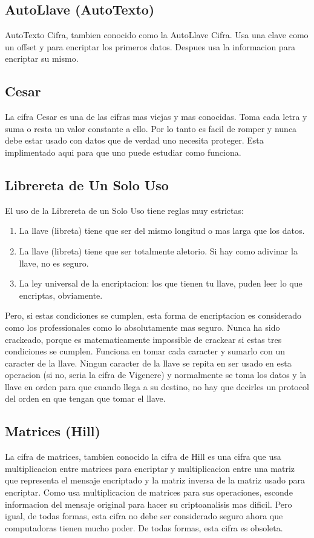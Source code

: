 \documentclass{article}
\begin{document}
		\subsection{AutoLlave (AutoTexto)}
			AutoTexto Cifra, tambien conocido como la AutoLlave Cifra. Usa una clave como un offset y para encriptar los primeros datos. Despues usa la informacion para encriptar su mismo.
		\subsection{Cesar}
			La cifra Cesar es una de las cifras mas viejas y mas conocidas. Toma cada letra y suma o resta un valor constante a ello. Por lo tanto es facil de romper y nunca debe estar usado con datos que de verdad uno necesita proteger. Esta implimentado aqui para que uno puede estudiar como funciona.
		\subsection{Librereta de Un Solo Uso}
			El uso de la Librereta de un Solo Uso tiene reglas muy estrictas:
			\begin{enumerate}  
				\item La llave (libreta) tiene que ser del mismo longitud o mas larga que los datos.
				\item La llave (libreta) tiene que ser totalmente aletorio. Si hay como adivinar la llave, no es seguro.
				\item La ley universal de la encriptacion: los que tienen tu llave, puden leer lo que encriptas, obviamente.
			\end{enumerate}  
			Pero, si estas condiciones se cumplen, esta forma de encriptacion es considerado como los professionales como lo absolutamente mas seguro. Nunca ha sido crackeado, porque es matematicamente impossible de crackear si estas tres condiciones se cumplen. Funciona en tomar cada caracter y sumarlo con un caracter de la llave. Ningun caracter de la llave se repita en ser usado en esta operacion (si no, seria la cifra de Vigenere) y normalmente se toma los datos y la llave en orden para que cuando llega a su destino, no hay que decirles un protocol del orden en que tengan que tomar el llave.
		\subsection{Matrices (Hill)}
			La cifra de matrices, tambien conocido la cifra de Hill es una cifra que usa multiplicacion entre matrices para encriptar y multiplicacion entre una matriz que representa el mensaje encriptado y la matriz inversa de la matriz usado para encriptar. Como usa multiplicacion de matrices para sus operaciones, esconde informacion del mensaje original para hacer su criptoanalisis mas dificil. Pero igual, de todas formas, esta cifra no debe ser considerado seguro ahora que computadoras tienen mucho poder. De todas formas, esta cifra es obsoleta.
\end{document}
